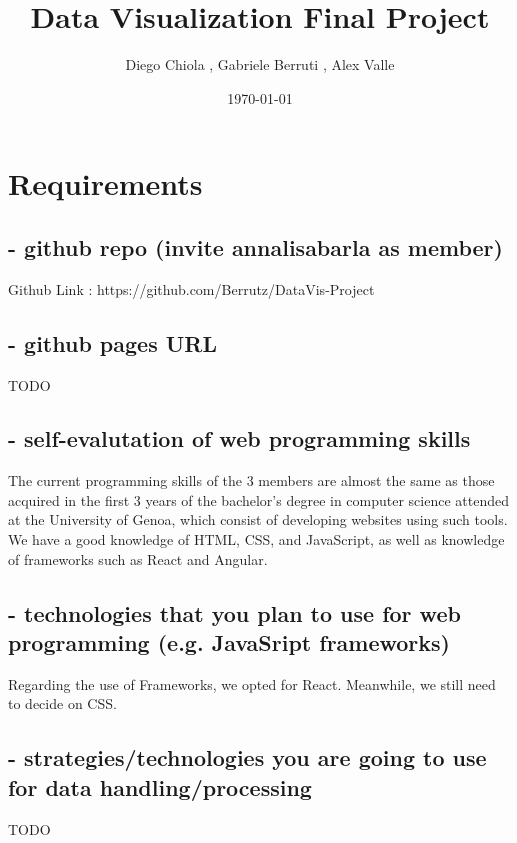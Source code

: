 \documentclass{article}
\title{Data Visualization Final Project}
\author{Diego Chiola , Gabriele Berruti , Alex Valle}
\date{\today}                %
\begin{document}
\maketitle                   %

\section{Requirements}

\subsection{- github repo (invite annalisabarla as member)}
Github Link : https://github.com/Berrutz/DataVis-Project

\subsection{- github pages URL}
TODO

\subsection{- self-evalutation of web programming skills}
The current programming skills of the 3 members are almost the same as those acquired in the first 
3 years of the bachelor's degree in computer science attended at the University of Genoa, 
which consist of developing websites using such tools. We have a good knowledge of HTML, CSS, and JavaScript, 
as well as knowledge of frameworks such as React and Angular.

\subsection{- technologies that you plan to use for web programming (e.g. JavaSript frameworks)}
Regarding the use of Frameworks, we opted for React. Meanwhile, we still need to decide on CSS. 


\subsection{- strategies/technologies you are going to use for data handling/processing}
TODO
\end{document}

